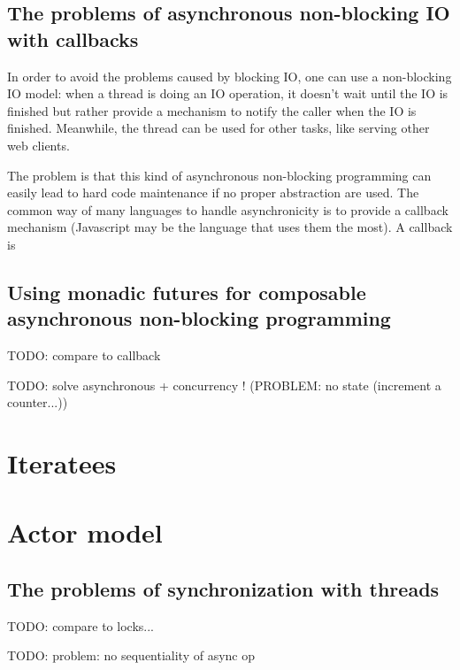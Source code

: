 \subsection{The problems of asynchronous non-blocking IO with callbacks}
In order to avoid the problems caused by blocking IO, one can use a non-blocking IO model: when a thread is doing an IO operation, it doesn't wait
until the IO is finished but rather provide a mechanism to notify the caller when the IO is finished. Meanwhile, the thread can be used for other tasks, like
serving other web clients. 

The problem is that this kind of asynchronous non-blocking programming can easily lead to hard code maintenance if no proper abstraction are used. The common way
of many languages to handle asynchronicity is to provide a callback mechanism (Javascript may be the language that uses them the most). A callback is


\subsection{Using monadic futures for composable asynchronous non-blocking programming}



TODO: compare to callback

TODO: solve asynchronous + concurrency ! (PROBLEM: no state (increment a counter...))

\section{Iteratees}



\section{Actor model}

\subsection{The problems of synchronization with threads}

TODO: compare to locks...

TODO: problem: no sequentiality of async op
